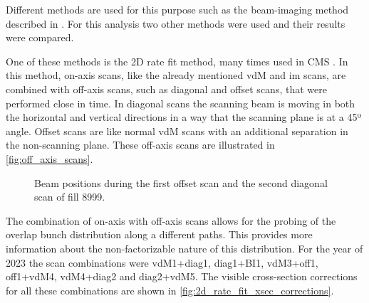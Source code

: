 Different methods are used for this purpose such as the beam-imaging method described in \cite{Klute_2017, knolle2019factorizationbiasvander, Knolle:442689}. For this analysis two other methods were used and their results were compared.

One of these methods is the 2D rate fit method, many times used in CMS \cite{CMS-PAS-LUM-18-002, CMS-PAS-LUM-22-001}. In this method, on-axis scans, like the already mentioned vdM and im scans, are combined with off-axis scans, such as diagonal and offset scans, that were performed close in time. In diagonal scans the scanning beam is moving in both the horizontal and vertical directions in a way that the scanning plane is at a 45º angle. Offset scans are like normal vdM scans with an additional separation in the non-scanning plane. These off-axis scans are illustrated in \autoref{fig:off_axis_scans}.

\begin{figure}[!htb]
	\centering
	\caption{Beam positions during the first offset scan and the second diagonal scan of fill 8999.}
	\label{fig:off_axis_scans}
\end{figure}

The combination of on-axis with off-axis scans allows for the probing of the overlap bunch distribution along a different paths. This provides more information about the non-factorizable nature of this distribution. For the year of 2023 the scan combinations were vdM1+diag1, diag1+BI1, vdM3+off1, off1+vdM4, vdM4+diag2 and diag2+vdM5. The visible cross-section corrections for all these combinations are shown in \autoref{fig:2d_rate_fit_xsec_corrections}.

